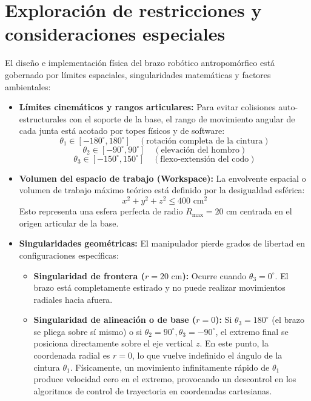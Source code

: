 \documentclass[11pt,a4paper]{article}
\begin{document}
\section{Exploración de restricciones y consideraciones especiales}
El diseño e implementación física del brazo robótico antropomórfico está gobernado por límites espaciales, singularidades matemáticas y factores ambientales:
\begin{itemize}
    \item \textbf{Límites cinemáticos y rangos articulares:}
    Para evitar colisiones auto-estructurales con el soporte de la base, el rango de movimiento angular de cada junta está acotado por topes físicos y de software:
    $$\theta_1 \in [-180^\circ, 180^\circ] \quad (\text{rotación completa de la cintura})$$
    $$\theta_2 \in [-90^\circ, 90^\circ] \quad (\text{elevación del hombro})$$
    $$\theta_3 \in [-150^\circ, 150^\circ] \quad (\text{flexo-extensión del codo})$$
    \item \textbf{Volumen del espacio de trabajo (Workspace):}
    La envolvente espacial o volumen de trabajo máximo teórico está definido por la desigualdad esférica:
    $$x^2 + y^2 + z^2 \le 400\text{ cm}^2$$
    Esto representa una esfera perfecta de radio $R_{\text{max}} = 20\text{ cm}$ centrada en el origen articular de la base.
    \item \textbf{Singularidades geométricas:}
    El manipulador pierde grados de libertad en configuraciones específicas:
    \begin{itemize}
        \item \textbf{Singularidad de frontera ($r = 20\text{ cm}$):} Ocurre cuando $\theta_3 = 0^\circ$. El brazo está completamente estirado y no puede realizar movimientos radiales hacia afuera.
        \item \textbf{Singularidad de alineación o de base ($r = 0$):} Si $\theta_3 = 180^\circ$ (el brazo se pliega sobre sí mismo) o si $\theta_2 = 90^\circ, \theta_3 = -90^\circ$, el extremo final se posiciona directamente sobre el eje vertical $z$. En este punto, la coordenada radial es $r = 0$, lo que vuelve indefinido el ángulo de la cintura $\theta_1$. Físicamente, un movimiento infinitamente rápido de $\theta_1$ produce velocidad cero en el extremo, provocando un descontrol en los algoritmos de control de trayectoria en coordenadas cartesianas.

\end{itemize}
\end{itemize}
\end{document}
